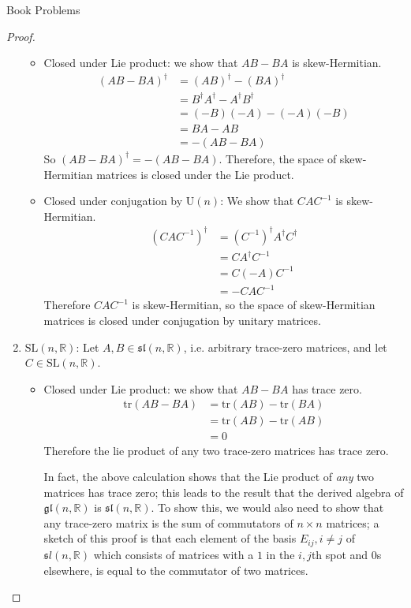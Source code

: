 \documentclass[12pt]{article}
\newcommand{\R}{\mathbb{R}}
\theoremstyle{definition}
\newenvironment{problem}[2][Problem]{\begin{trivlist}
\item[\hskip \labelsep {\bfseries #1}\hskip \labelsep {\bfseries #2.}]}{\end{trivlist}}
\begin{document}
\begin{section}{Book Problems}
\begin{problem}{1}
\begin{proof}
\begin{enumerate}[label=(\alph*)]
					\begin{itemize}
						\item Closed under Lie product: we show that $AB - BA$ is skew-Hermitian.
							\begin{align*}
								(AB - BA)^{\dagger} &= (AB)^\dagger - (BA)^\dagger\\
								&= B^\dagger A^\dagger - A^\dagger B^\dagger\\
								&= (-B)(-A) - (-A)(-B)\\
								&= BA - AB\\
								&= -(AB - BA)
							\end{align*}
							So $(AB - BA)^\dagger = -(AB - BA)$. Therefore, the space of skew-Hermitian matrices is closed under the Lie product.
						\item Closed under conjugation by $\text{U}(n)$: We show that $CAC^{-1}$ is skew-Hermitian.
							\begin{align*}
								(CAC^{-1})^\dagger &= (C^{-1})^\dagger A^\dagger C^\dagger\\
								&= CA^\dagger C^{-1}\\
								&= C(-A)C^{-1}\\
								&= -CAC^{-1}
							\end{align*}
							Therefore $CAC^{-1}$ is skew-Hermitian, so the space of skew-Hermitian matrices is closed under conjugation by unitary matrices.
					\end{itemize}
				\item $\text{SL}(n, \R)$: Let $A, B \in \mathfrak{sl}(n, \R)$, i.e. arbitrary trace-zero matrices, and let $C \in \text{SL}(n, \R)$.
					\begin{itemize}
						\item Closed under Lie product: we show that $AB - BA$ has trace zero. 
							\begin{align*}
								\text{tr}(AB - BA) &= \text{tr}(AB) - \text{tr}(BA)\\
								&= \text{tr}(AB) - \text{tr}(AB)\\
								&= 0
							\end{align*}
							Therefore the lie product of any two trace-zero matrices has trace zero. 
							\par In fact, the above calculation shows that the Lie product of \textit{any} two matrices has trace zero; this leads to the result that the derived algebra of $\mathfrak{gl}(n, \R)$ is $\mathfrak{sl}(n, \R)$. To show this, we would also need to show that any trace-zero matrix is the sum of commutators of $n\times n$ matrices; a sketch of this proof is that each element of the basis $E_{ij}, i \neq j$ of $\mathfrak sl (n, \R)$ which consists of matrices with a $1$ in the $i, j$th spot and $0$s elsewhere, is equal to the commutator of two matrices.

\end{itemize}
\end{enumerate}
\end{proof}
\end{problem}
\end{section}
\end{document}
